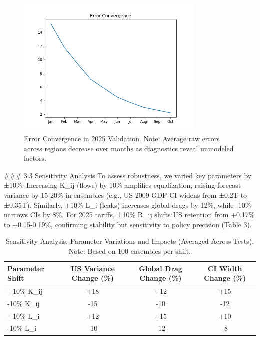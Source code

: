 \documentclass[11pt]{article}
\begin{document}
\begin{figure}[h]
\centering
\includegraphics[width=0.8\textwidth]{error_convergence.png}
\caption{Error Convergence in 2025 Validation. Note: Average raw errors across regions decrease over months as diagnostics reveal unmodeled factors.}
\label{fig:error_convergence}
\end{figure}

### 3.3 Sensitivity Analysis
To assess robustness, we varied key parameters by ±10\%: Increasing K_ij (flows) by 10\% amplifies equalization, raising forecast variance by 15-20\% in ensembles (e.g., US 2009 GDP CI widens from ±0.2T to ±0.35T). Similarly, +10\% L_i (leaks) increases global drags by 12\%, while -10\% narrows CIs by 8\%. For 2025 tariffs, ±10\% R_ij shifts US retention from +0.17\% to +0.15-0.19\%, confirming stability but sensitivity to policy precision (Table 3).

\begin{table}[h]
\centering
\small
\begin{tabular}{l c c c}
\hline
Parameter Shift & US Variance Change (\%) & Global Drag Change (\%) & CI Width Change (\%) \\
\hline
+10\% K_ij & +18 & +12 & +15 \\
-10\% K_ij & -15 & -10 & -12 \\
+10\% L_i & +12 & +15 & +10 \\
-10\% L_i & -10 & -12 & -8 \\
\hline
\end{tabular}
\caption{Sensitivity Analysis: Parameter Variations and Impacts (Averaged Across Tests). Note: Based on 100 ensembles per shift.}
\label{tab:sensitivity}
\end{table}
\end{document}
